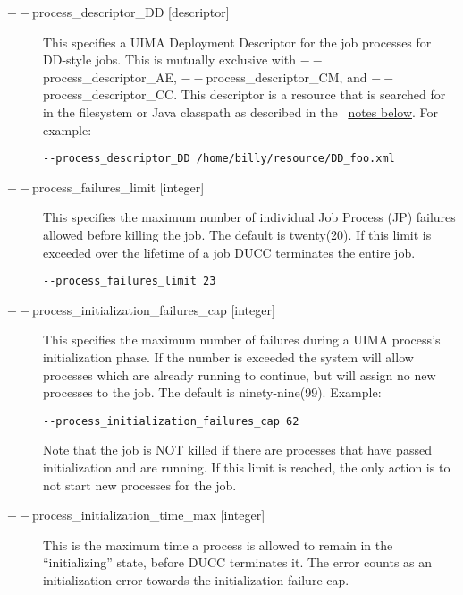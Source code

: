 \begin{description}
           \item[$--$process\_descriptor\_DD {[descriptor]}  ]

             This specifies a UIMA Deployment Descriptor for the job processes for DD-style jobs. 
             This is mutually exclusive with $--$process\_descriptor\_AE, $--$process\_descriptor\_CM, 
             and $--$process\_descriptor\_CC. This 
             descriptor is a resource that is searched for in the filesystem or Java classpath as described 
             in the ~\hyperref[par:cli.submit.notes]{notes below}.
             For example:
             \begin{verbatim}
--process_descriptor_DD /home/billy/resource/DD_foo.xml 
             \end{verbatim}

           \item[$--$process\_failures\_limit {[integer]} ]
             This specifies the maximum number of individual Job Process (JP) failures allowed
             before killing the job. The default is twenty(20). If this limit is exceeded over the lifetime 
             of a job DUCC terminates the entire job. 
\begin{verbatim}
--process_failures_limit 23
\end{verbatim}
                          
           \item[$--$process\_initialization\_failures\_cap {[integer]} ] This specifies the maximum
             number of failures during a UIMA process's initialization phase.  If the number is
             exceeded the system will allow processes which are already running to continue, but
             will assign no new processes to the job.  The default is ninety-nine(99). Example:
             \begin{verbatim}
--process_initialization_failures_cap 62 
             \end{verbatim}
             
             Note that the job is NOT killed if there are processes that have passed initialization and are 
             running. If this limit is reached, the only action is to not start new processes for the job. 

           \item[$--$process\_initialization\_time\_max {[integer]}] This is the maximum time a process
             is allowed to remain in the ``initializing'' state, before DUCC terminates it.  The error
             counts as an initialization error towards the initialization failure cap.


\end{description}
